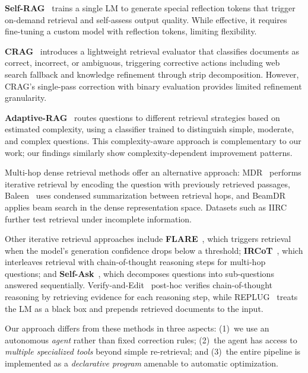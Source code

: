 \textbf{Self-RAG}~\cite{asai2024selfrag} trains a single LM to generate special reflection tokens that trigger on-demand retrieval and self-assess output quality.
While effective, it requires fine-tuning a custom model with reflection tokens, limiting flexibility.

\textbf{CRAG}~\cite{yan2024crag} introduces a lightweight retrieval evaluator that classifies documents as correct, incorrect, or ambiguous, triggering corrective actions including web search fallback and knowledge refinement through strip decomposition.
However, CRAG's single-pass correction with binary evaluation provides limited refinement granularity.

\textbf{Adaptive-RAG}~\cite{jeong2024adaptiverag} routes questions to different retrieval strategies based on estimated complexity, using a classifier trained to distinguish simple, moderate, and complex questions.
This complexity-aware approach is complementary to our work; our findings similarly show complexity-dependent improvement patterns.

Multi-hop dense retrieval methods offer an alternative approach: MDR~\cite{xiong2021mdr} performs iterative retrieval by encoding the question with previously retrieved passages, Baleen~\cite{khattab2021baleen} uses condensed summarization between retrieval hops, and BeamDR~\cite{zhao2021beamdr} applies beam search in the dense representation space.
Datasets such as IIRC~\cite{ferguson2020iirc} further test retrieval under incomplete information.

Other iterative retrieval approaches include \textbf{FLARE}~\cite{jiang2023flare}, which triggers retrieval when the model's generation confidence drops below a threshold;
\textbf{IRCoT}~\cite{trivedi2023ircot}, which interleaves retrieval with chain-of-thought reasoning steps for multi-hop questions;
and \textbf{Self-Ask}~\cite{press2023selfask}, which decomposes questions into sub-questions answered sequentially.
Verify-and-Edit~\cite{zhao2023verify} post-hoc verifies chain-of-thought reasoning by retrieving evidence for each reasoning step, while REPLUG~\cite{shi2024replug} treats the LM as a black box and prepends retrieved documents to the input.

Our approach differs from these methods in three aspects: (1)~we use an autonomous \emph{agent} rather than fixed correction rules; (2)~the agent has access to \emph{multiple specialized tools} beyond simple re-retrieval; and (3)~the entire pipeline is implemented as a \emph{declarative program} amenable to automatic optimization.

